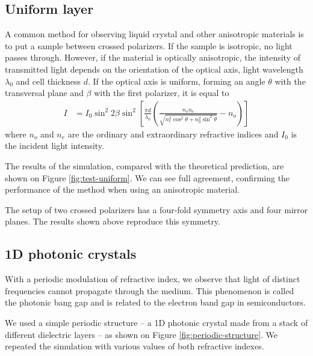 \documentclass[a4paper,10pt]{article}
\renewenvironment{figure}
  {\par\medskip\noindent\minipage{\linewidth}}
  {\endminipage\par\medskip}
\begin{document}
\begin{multicols}{2}
\subsection{Uniform layer}

A common method for observing liquid crystal and other anisotropic materials is to put a sample between crossed polarizers. 
If the sample is isotropic, no light passes through. 
However, if the material is optically anisotropic, the intensity of transmitted light depends on the orientation of the optical axis, light wavelength $\lambda_0$ and cell thickness $d$. 
If the optical axis is uniform, forming an angle $\theta$ with the transversal plane and $\beta$ with the first polarizer, it is equal to\cite{kleman}
\begin{align}
 I &= I_0 \sin^2 2\beta \sin^2 \left[ \frac{\pi d}{\lambda_0} \left( \frac{n_o n_e}{\sqrt{n_e^2 \cos^2 \theta + n_0^2 \sin^2 \theta}} - n_o \right)\right] \nonumber
\end{align}
where $n_o$ and $n_e$ are the ordinary and extraordinary refractive indices and $I_0$ is the incident light intensity. 

The results of the simulation, compared with the theoretical prediction, are shown on Figure \ref{fig:test-uniform}. 
We can see full agreement, confirming the performance of the method when using an anisotropic material. 

\begin{figure}
\centering
 \resizebox{\textwidth}{!}{}
 \label{fig:test-uniform}
\end{figure}

The setup of two crossed polarizers has a four-fold symmetry axis and four mirror planes. 
The results shown above reproduce this symmetry. 

\subsection{1D photonic crystals}

With a periodic modulation of refractive index, we observe that light of distinct frequencies cannot propagate through the medium\cite{hecht-nano,joannopoulos}. 
This phenomenon is called the photonic bang gap and is related to the electron band gap in semiconductors. 

We used a simple periodic structure -- a 1D photonic crystal made from a stack of different dielectric layers -- as shown on Figure \ref{fig:periodic-structure}. 
We repeated the simulation with various values of both refractive indexes. 


\end{multicols}
\end{document}
